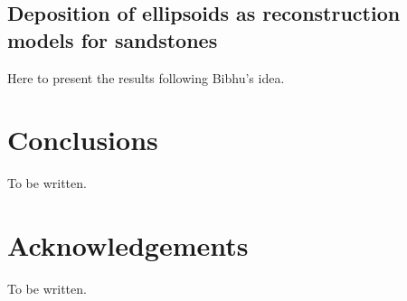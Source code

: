\documentclass[aps,twocolumn,superscriptaddress,showpacs,showkeys]{revtex4-1}
\begin{document}
\subsection{Deposition of ellipsoids as reconstruction models for sandstones}
\label{sec:sandstone}
Here to present the results following Bibhu's idea.

\section{Conclusions}
\label{sec:conclusions}
To be written.

\section*{Acknowledgements}
To be written.






\end{document}
